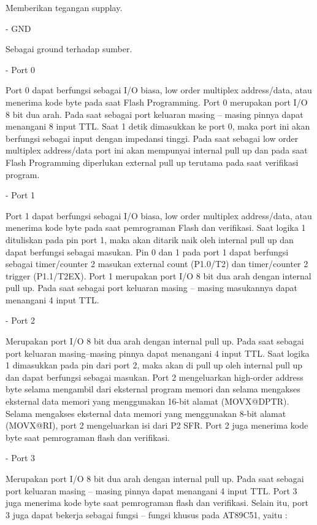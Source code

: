 \documentclass{jtetiproposalskripsi}
\begin{document}
	Memberikan tegangan supplay.
	
-	GND

Sebagai ground terhadap sumber.

-	Port 0

Port 0 dapat berfungsi sebagai I/O biasa, low order multiplex address/data, atau menerima kode byte pada saat Flash Programming. Port 0 merupakan port I/O 8 bit dua arah. Pada saat sebagai port keluaran masing – masing pinnya dapat menangani 8 input TTL. Saat 1 detik dimasukkan ke port 0, maka port ini akan berfungsi sebagai input dengan impedansi tinggi. Pada saat sebagai low order multiplex address/data port ini akan mempunyai internal pull up dan pada saat Flash Programming diperlukan external pull up terutama pada saat verifikasi program.

-	Port 1

Port 1 dapat berfungsi sebagai I/O biasa, low order multiplex address/data, atau menerima kode byte pada saat pemrograman Flash dan verifikasi. Saat logika 1 dituliskan pada pin port 1, maka akan ditarik naik oleh internal pull up dan dapat berfungsi sebagai masukan. Pin 0 dan 1 pada port 1 dapat berfungsi sebagai timer/counter 2 masukan external count (P1.0/T2) dan timer/counter 2 trigger (P1.1/T2EX).  Port 1 merupakan port I/O 8 bit dua arah  dengan internal pull up. Pada saat sebagai port keluaran masing – masing masukannya dapat menangani 4 input TTL.

-	Port 2

Merupakan port I/O 8 bit dua arah dengan internal pull up. Pada saat sebagai port keluaran masing–masing pinnya dapat menangani 4 input TTL. Saat logika 1 dimasukkan pada pin dari port 2, maka akan di pull up oleh internal pull up dan dapat berfungsi sebagai masukan. Port 2 mengeluarkan high-order address byte selama mengambil dari eksternal program memori dan selama mengakses eksternal data memori yang menggunakan 16-bit alamat (MOVX@DPTR). Selama mengakses eksternal data memori yang menggunakan 8-bit alamat (MOVX@RI), port 2 mengeluarkan isi dari P2 SFR. Port 2 juga menerima kode byte saat pemrograman flash dan verifikasi.

-	Port 3

Merupakan port I/O 8 bit dua arah dengan internal pull up. Pada saat sebagai port keluaran masing – masing pinnya dapat menangani 4 input TTL. Port 3 juga menerima kode byte saat pemrograman flash dan verifikasi. Selain itu, port 3 juga dapat bekerja sebagai fungsi – fungsi khusus pada AT89C51, yaitu :
\end{document}
